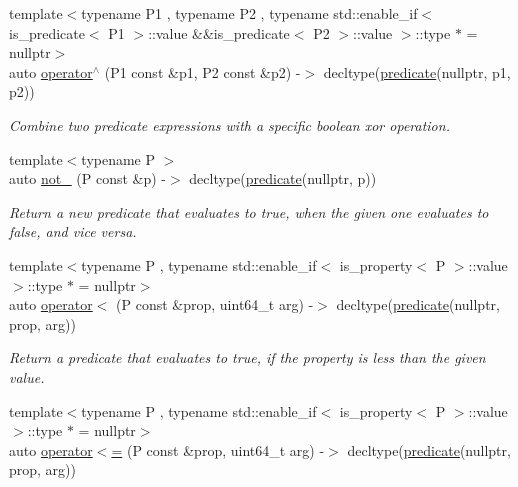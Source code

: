 \begin{DoxyCompactItemize}
{\footnotesize template$<$typename P1 , typename P2 , typename std\+::enable\+\_\+if$<$ is\+\_\+predicate$<$ P1 $>$\+::value \&\&is\+\_\+predicate$<$ P2 $>$\+::value $>$\+::type $\ast$  = nullptr$>$ }\\auto \hyperlink{namespacepfq_1_1lang_aa6692a978788617acebfee6ded6ebbbc}{operator$^\wedge$} (P1 const \&p1, P2 const \&p2) -\/$>$ decltype(\hyperlink{namespacepfq_1_1lang_aca9adafc436b7f851621b979fa1aaf88}{predicate}(nullptr, p1, p2))
\begin{DoxyCompactList}\small\item\em Combine two predicate expressions with a specific boolean \textquotesingle{}xor\textquotesingle{} operation. \end{DoxyCompactList}\item 
{\footnotesize template$<$typename P $>$ }\\auto \hyperlink{namespacepfq_1_1lang_aad91ae49c0ddea5a9219f679e8de212a}{not\+\_\+} (P const \&p) -\/$>$ decltype(\hyperlink{namespacepfq_1_1lang_aca9adafc436b7f851621b979fa1aaf88}{predicate}(nullptr, p))
\begin{DoxyCompactList}\small\item\em Return a new predicate that evaluates to true, when the given one evaluates to false, and vice versa. \end{DoxyCompactList}\item 
{\footnotesize template$<$typename P , typename std\+::enable\+\_\+if$<$ is\+\_\+property$<$ P $>$\+::value $>$\+::type $\ast$  = nullptr$>$ }\\auto \hyperlink{namespacepfq_1_1lang_aa358821bfd1326e552c69635b969835d}{operator$<$} (P const \&prop, uint64\+\_\+t arg) -\/$>$ decltype(\hyperlink{namespacepfq_1_1lang_aca9adafc436b7f851621b979fa1aaf88}{predicate}(nullptr, prop, arg))
\begin{DoxyCompactList}\small\item\em Return a predicate that evaluates to {\ttfamily true}, if the property is less than the given value. \end{DoxyCompactList}\item 
{\footnotesize template$<$typename P , typename std\+::enable\+\_\+if$<$ is\+\_\+property$<$ P $>$\+::value $>$\+::type $\ast$  = nullptr$>$ }\\auto \hyperlink{namespacepfq_1_1lang_a039a937311f139f9a6e84c49c6505c70}{operator$<$=} (P const \&prop, uint64\+\_\+t arg) -\/$>$ decltype(\hyperlink{namespacepfq_1_1lang_aca9adafc436b7f851621b979fa1aaf88}{predicate}(nullptr, prop, arg))
\item 

\end{DoxyCompactItemize}

